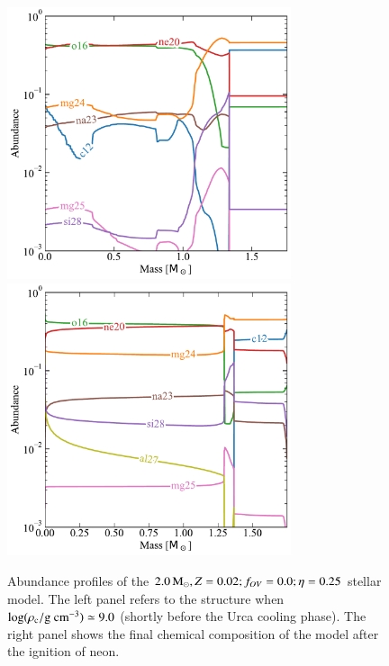 \documentclass[main.tex]{subfiles}
\begin{document}
\begin{subappendices}
\begin{figure}[hbt!]
    \centering 
    \includegraphics[height=8cm]{figures/chapter2/abundances/2p0_eta0p25_Rho9.pdf}\quad
    \includegraphics[height=8cm]{figures/chapter2/abundances/2p0_eta0p25_final_abun.pdf}
    \caption{Abundance profiles of the \seriestwo $ 2.0\mathrm{\,M_\odot},  Z=0.02;f_{OV}=0.0; \eta=0.25$ stellar model. The left panel refers to the structure when $\rm \log(\rho_c / g \ cm^{-3}) \simeq 9.0$ (shortly before the Urca cooling phase). The right panel shows the final chemical composition of the model after the ignition of neon.}
    \label{apx:ch2:fig:eta0p25}
\end{figure}


\end{subappendices}
\end{document}
